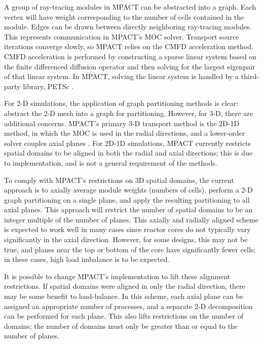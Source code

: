 {{    A group of ray-tracing modules in MPACT can be abstracted into a graph.
    Each vertex will have weight corresponding to the number of cells contained in the module.
    Edges can be drawn between directly neighboring ray-tracing modules.
    This represents communication in MPACT's MOC solver.
    Transport source iterations converge slowly, so MPACT relies on the \ac{CMFD} \cite{Smith1983} acceleration method.
    \ac{CMFD} acceleration is performed by constructing a sparse linear system based on the finite differenced diffusion operator and then solving for the largest eigenpair of that linear system.
    In MPACT, solving the linear system is handled by a third-party library, PETSc \cite{Petsc}.

    For 2-D simulations, the application of graph partitioning methods is clear: abstract the 2-D mesh into a graph for partitioning.
    However, for 3-D, there are additional concerns.
    MPACT's primary 3-D transport method is the 2D-1D method, in which the \ac{MOC} is used in the radial directions, and a lower-order solver couples axial planes \cite{Collins2016}.
    For 2D-1D simulations, MPACT currently restricts spatial domains to be aligned in both the radial and axial directions; this is due to implementation, and is not a general requirement of the methods.

    To comply with MPACT's restrictions on 3D spatial domains, the current approach is to axially average module weights (numbers of cells), perform a 2-D graph partitioning on a single plane, and apply the resulting partitioning to all axial planes.
    This approach will restrict the number of spatial domains to be an integer multiple of the number of planes.
    This axially and radially aligned scheme is expected to work well in many cases since reactor cores do not typically vary significantly in the axial direction.
    However, for some designs, this may not be true, and planes near the top or bottom of the core have significantly fewer cells; in these cases, high load imbalance is to be expected.

    It is possible to change MPACT's implementation to lift these alignment restrictions.
    If spatial domains were aligned in only the radial direction, there may be some benefit to load-balance.
    In this scheme, each axial plane can be assigned an appropriate number of processes, and a separate 2-D decomposition can be performed for each plane.
    This also lifts restrictions on the number of domains; the number of domains must only be greater than or equal to the number of planes.

}}
